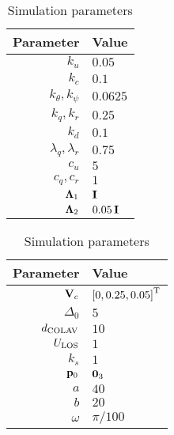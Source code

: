 \begin{table}[b]
    \centering
    \begin{tabular}[t]{r|l}
        {\bf Parameter} & {\bf Value} \\ \hline
        $k_u$ & $0.05$ \\
        $k_c$ & $0.1$ \\
        $k_{\theta}, k_{\psi}$ & $0.0625$ \\
        $k_q, k_r$ & $0.25$ \\
        $k_d$ & $0.1$ \\
        $\lambda_q, \lambda_r$ & $0.75$ \\
        $c_u$ & $5$ \\
        $c_q, c_r$ & $1$ \\
        $\bm{\Lambda}_1$ & $\mathbf{I}$ \\
        $\bm{\Lambda}_2$ & $0.05\,\mathbf{I}$
    \end{tabular}
    \begin{tabular}[t]{r|l}
        {\bf Parameter} & {\bf Value} \\ \hline
        $\mathbf{V}_c$ & $\left[0, 0.25, 0.05\right]^{\mathrm{T}}$ \\
        $\Delta_0$ & $5$ \\
        $d_{\rm COLAV}$ & $10$ \\
        $U_{\rm LOS}$ & $1$ \\
        $k_{s}$ & $1$ \\
        $\mathbf{p}_0$ & $\mathbf{0}_3$ \\
        $a$ & $40$ \\
        $b$ & $20$ \\
        $\omega$ & $\pi / 100$
    \end{tabular}
    \caption{Simulation parameters}
    \label{tab:nsb_5dof_params}
\end{table}

